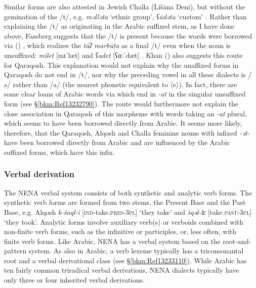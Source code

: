 \documentclass[output=paper]{langsci/langscibook}
\begin{document}
Similar forms are also attested in Jewish Challa (Lišāna Deni), but without the gemination of the /t/, e.g. \textit{məlləta} ‘ethnic group’, \textit{ʕādəta} ‘custom’ \citep[52]{Fassberg2010}. Rather than explaining the /t/ as originating in the Arabic suffixed {stem}, as I have done above, Fassberg suggests that the /t/ is present because the words were borrowed via () , which realizes the \textit{tāʔ} \textit{marbūṭa} as a final /t/ even when the noun is unsuffixed: \textit{milet} [mɪˈlæt] and \textit{ʕadet} [ʕɑːˈdæt] \citep[387]{Chyet2003}. Khan (\citeyear[206]{Khan2002}) also suggests this route for Qaraqosh. This explanation would not explain why the unaffixed forms in Qaraqosh do not end in /t/, nor why the preceding vowel in all these dialects is /ə/ rather than /a/ (the nearest phonetic equivalent to  〈e〉). In fact, there are some clear loans of Arabic words via  which end in \textit{{}-at} in the singular unsuffixed form (see §\ref{bkm:Ref13232790}). The  route would furthermore not explain the close association in Qaraqosh of this morpheme with words taking an \textit{\nobreakdash-at} plural, which seems to have been borrowed directly from Arabic. It seems more likely, therefore, that the Qaraqosh, Alqosh and Challa feminine nouns with infixed \textit{\nobreakdash-ət\nobreakdash-} have been borrowed directly from Arabic and are influenced by the Arabic suffixed forms, which have this infix.



\subsubsection{\label{bkm:Ref13233345}Verbal derivation}

The NENA verbal system consists of both synthetic and analytic verb forms. The synthetic verb forms are formed from two stems, the Present Base and the Past Base, e.g.  Alqosh \textit{k\nobreakdash-šaql\nobreakdash-i} [\textsc{ind\nobreakdash-}take.\textsc{pres\nobreakdash-3pl]} ‘they take’ and \textit{šqəl\nobreakdash-lɛ} [take.\textsc{past\nobreakdash-3pl}] ‘they took’. Analytic forms involve {auxiliary verb(s)} or verboids combined with non-finite verb forms, such as the {infinitive} or participles, or, less often, with finite verb forms. Like Arabic, NENA has a verbal system based on the {root-and-pattern} system. As also in Arabic, a verb lexeme typically has a {triconsonantal} {root} and a verbal {derivational} class (see §\ref{bkm:Ref13233110}). While  Arabic has ten fairly common triradical verbal derivations, NENA dialects typically have only three or four inherited verbal derivations.
\end{document}
